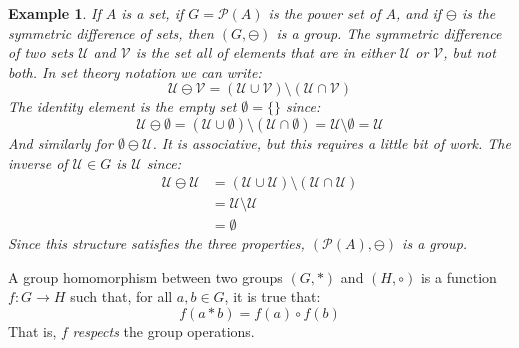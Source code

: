 \documentclass{article}
\theoremstyle{plain}
\theoremstyle{normal}
\newtheorem{example}{Example}[section]
\begin{document}
            \begin{example}
                \label{ex:sym_diff_is_group}%
                If $A$ is a set, if $G=\mathcal{P}(A)$ is the power set of $A$,
                and if $\ominus$ is the \textit{symmetric difference} of sets,
                then $(G,\ominus)$ is a group. The symmetric difference of two
                sets $\mathcal{U}$ and $\mathcal{V}$ is the set all of elements
                that are in either $\mathcal{U}$ or $\mathcal{V}$, but not
                both. In set theory notation we can write:
                \begin{equation}
                    \mathcal{U}\ominus\mathcal{V}=
                        (\mathcal{U}\cup\mathcal{V})\setminus
                        (\mathcal{U}\cap\mathcal{V})
                \end{equation}
                The identity element is the empty set $\emptyset=\{\}$ since:
                \begin{equation}
                    \mathcal{U}\ominus\emptyset
                        =(\mathcal{U}\cup\emptyset)\setminus
                            (\mathcal{U}\cap\emptyset)
                        =\mathcal{U}\setminus\emptyset
                        =\mathcal{U}
                \end{equation}
                And similarly for $\emptyset\ominus\mathcal{U}$.
                It is associative, but this requires a little bit of work.
                The inverse of $\mathcal{U}\in{G}$ is $\mathcal{U}$ since:
                \begin{align}
                    \mathcal{U}\ominus\mathcal{U}
                    &=(\mathcal{U}\cup\mathcal{U})\setminus
                      (\mathcal{U}\cap\mathcal{U})\\
                    &=\mathcal{U}\setminus\mathcal{U}\\
                    &=\emptyset
                \end{align}
                Since this structure satisfies the three properties,
                $(\mathcal{P}(A),\ominus)$ is a group.
            \end{example}
            A group homomorphism between two groups $(G,*)$ and $(H,\circ)$ is
            a function $f:G\rightarrow{H}$ such that, for all $a,b\in{G}$, it
            is true that:
            \begin{equation}
                f(a*b)=f(a)\circ{f}(b)
            \end{equation}
            That is, $f$ \textit{respects} the group operations.
\end{document}
